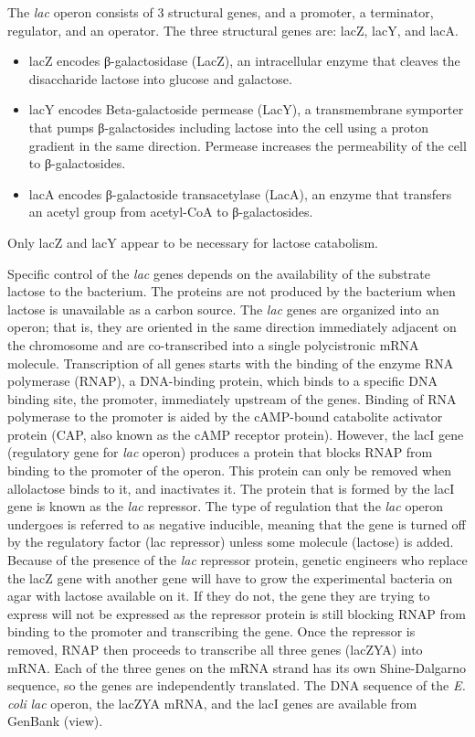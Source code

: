 The \emph{lac} operon consists of 3 structural genes, and a promoter, a terminator, regulator, and an operator. The three structural genes are: lacZ, lacY, and lacA.

\begin{itemize}
\tightlist
\item
  lacZ encodes β-galactosidase (LacZ), an intracellular enzyme that cleaves the disaccharide lactose into glucose and galactose.
\item
  lacY encodes Beta-galactoside permease (LacY), a transmembrane symporter that pumps β-galactosides including lactose into the cell using a proton gradient in the same direction. Permease increases the permeability of the cell to β-galactosides.
\item
  lacA encodes β-galactoside transacetylase (LacA), an enzyme that transfers an acetyl group from acetyl-CoA to β-galactosides.
\end{itemize}

Only lacZ and lacY appear to be necessary for lactose catabolism.

Specific control of the \emph{lac} genes depends on the availability of the substrate lactose to the bacterium. The proteins are not produced by the bacterium when lactose is unavailable as a carbon source. The \emph{lac} genes are organized into an operon; that is, they are oriented in the same direction immediately adjacent on the chromosome and are co-transcribed into a single polycistronic mRNA molecule. Transcription of all genes starts with the binding of the enzyme RNA polymerase (RNAP), a DNA-binding protein, which binds to a specific DNA binding site, the promoter, immediately upstream of the genes. Binding of RNA polymerase to the promoter is aided by the cAMP-bound catabolite activator protein (CAP, also known as the cAMP receptor protein). However, the lacI gene (regulatory gene for \emph{lac} operon) produces a protein that blocks RNAP from binding to the promoter of the operon. This protein can only be removed when allolactose binds to it, and inactivates it. The protein that is formed by the lacI gene is known as the \emph{lac} repressor. The type of regulation that the \emph{lac} operon undergoes is referred to as negative inducible, meaning that the gene is turned off by the regulatory factor (lac repressor) unless some molecule (lactose) is added. Because of the presence of the \emph{lac} repressor protein, genetic engineers who replace the lacZ gene with another gene will have to grow the experimental bacteria on agar with lactose available on it. If they do not, the gene they are trying to express will not be expressed as the repressor protein is still blocking RNAP from binding to the promoter and transcribing the gene. Once the repressor is removed, RNAP then proceeds to transcribe all three genes (lacZYA) into mRNA. Each of the three genes on the mRNA strand has its own Shine-Dalgarno sequence, so the genes are independently translated. The DNA sequence of the \emph{E. coli} \emph{lac} operon, the lacZYA mRNA, and the lacI genes are available from GenBank (view).

